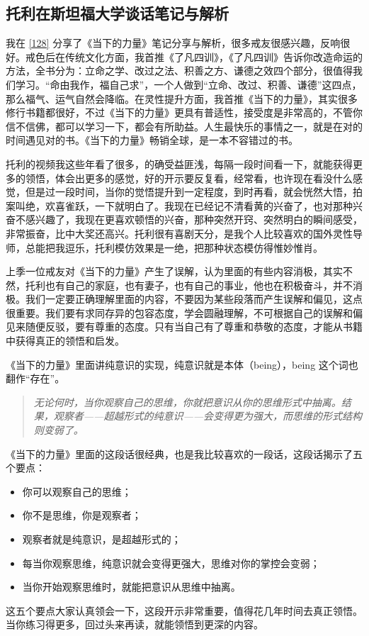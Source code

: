 \subsection{托利在斯坦福大学谈话笔记与解析}\label{135}

我在 \ref{128} 分享了《当下的力量》笔记分享与解析，很多戒友很感兴趣，反响很好。戒色后在传统文化方面，我首推《了凡四训》，《了凡四训》告诉你改造命运的方法，全书分为：立命之学、改过之法、积善之方、谦德之效四个部分，很值得我们学习。“命由我作，福自己求”，一个人做到“立命、改过、积善、谦德”这四点，那么福气、运气自然会降临。在灵性提升方面，我首推《当下的力量》，其实很多修行书籍都很好，不过《当下的力量》更具有普适性，接受度是非常高的，不管你信不信佛，都可以学习一下，都会有所助益。人生最快乐的事情之一，就是在对的时间遇见对的书。《当下的力量》畅销全球，是一本不容错过的书。

托利的视频我这些年看了很多，的确受益匪浅，每隔一段时间看一下，就能获得更多的领悟，体会出更多的感觉，好的开示要反复看，经常看，也许现在看没什么感觉，但是过一段时间，当你的觉悟提升到一定程度，到时再看，就会恍然大悟，拍案叫绝，欢喜雀跃，一下就明白了。我现在已经记不清看黄的兴奋了，也对那种兴奋不感兴趣了，我现在更喜欢顿悟的兴奋，那种突然开窍、突然明白的瞬间感受，非常振奋，比中大奖还高兴。托利很有喜剧天分，是我个人比较喜欢的国外灵性导师，总能把我逗乐，托利模仿效果是一绝，把那种状态模仿得惟妙惟肖。

上季一位戒友对《当下的力量》产生了误解，认为里面的有些内容消极，其实不然，托利也有自己的家庭，也有妻子，也有自己的事业，他也在积极奋斗，并不消极。我们一定要正确理解里面的内容，不要因为某些段落而产生误解和偏见，这点很重要。我们要有求同存异的包容态度，学会圆融理解，不可根据自己的误解和偏见来随便反驳，要有尊重的态度。只有当自己有了尊重和恭敬的态度，才能从书籍中获得真正的领悟和启发。

《当下的力量》里面讲纯意识的实现，纯意识就是本体（being），being 这个词也翻作“存在”。

\begin{quote}\it
    无论何时，当你观察自己的思维，你就把意识从你的思维形式中抽离。结果，观察者——超越形式的纯意识——会变得更为强大，而思维的形式结构则变弱了。
\end{quote}

《当下的力量》里面的这段话很经典，也是我比较喜欢的一段话，这段话揭示了五个要点：\begin{itemize}
    \item 你可以观察自己的思维；
    \item 你不是思维，你是观察者；
    \item 观察者就是纯意识，是超越形式的；
    \item 每当你观察思维，纯意识就会变得更强大，思维对你的掌控会变弱；
    \item 当你开始观察思维时，就能把意识从思维中抽离。
\end{itemize} 这五个要点大家认真领会一下，这段开示非常重要，值得花几年时间去真正领悟。当你练习得更多，回过头来再读，就能领悟到更深的内容。


